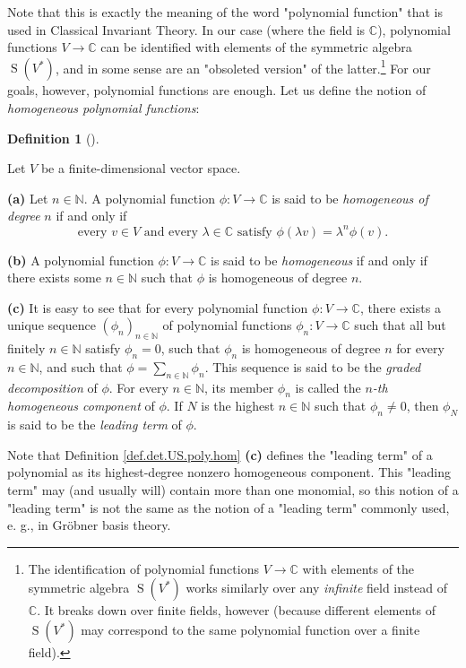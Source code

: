 \documentclass
[numbers=enddot,12pt,final,onecolumn,german,notitlepage]{scrartcl}%
\theoremstyle{definition}
\newtheorem{defi}[theo]{Definition}
\newenvironment{definition}[1][]
{\begin{defi}[#1]\begin{leftbar}}
{\end{leftbar}\end{defi}}
\begin{document}
Note that this is exactly the meaning of the word "polynomial function" that
is used in Classical Invariant Theory. In our case (where the field is
$\mathbb{C}$), polynomial functions $V\rightarrow\mathbb{C}$ can be identified
with elements of the symmetric algebra $\operatorname*{S}\left(  V^{\ast
}\right)  $, and in some sense are an "obsoleted version" of the
latter.\footnote{The identification of polynomial functions $V\rightarrow
\mathbb{C}$ with elements of the symmetric algebra $\operatorname*{S}\left(
V^{\ast}\right)  $ works similarly over any \textit{infinite} field instead of
$\mathbb{C}$. It breaks down over finite fields, however (because different
elements of $\operatorname*{S}\left(  V^{\ast}\right)  $ may correspond to the
same polynomial function over a finite field).} For our goals, however,
polynomial functions are enough. Let us define the notion of
\textit{homogeneous polynomial functions}:

\begin{definition}
\label{def.det.US.poly.hom}Let $V$ be a finite-dimensional vector space.

\textbf{(a)} Let $n\in\mathbb{N}$. A polynomial function $\phi:V\rightarrow
\mathbb{C}$ is said to be \textit{homogeneous of degree }$n$ if and only if%
\[
\text{every }v\in V\text{ and every }\lambda\in\mathbb{C}\text{ satisfy }%
\phi\left(  \lambda v\right)  =\lambda^{n}\phi\left(  v\right)  .
\]


\textbf{(b)} A polynomial function $\phi:V\rightarrow\mathbb{C}$ is said to be
\textit{homogeneous} if and only if there exists some $n\in\mathbb{N}$ such
that $\phi$ is homogeneous of degree $n$.

\textbf{(c)} It is easy to see that for every polynomial function
$\phi:V\rightarrow\mathbb{C}$, there exists a unique sequence $\left(
\phi_{n}\right)  _{n\in\mathbb{N}}$ of polynomial functions $\phi
_{n}:V\rightarrow\mathbb{C}$ such that all but finitely $n\in\mathbb{N}$
satisfy $\phi_{n}=0$, such that $\phi_{n}$ is homogeneous of degree $n$ for
every $n\in\mathbb{N}$, and such that $\phi=\sum\limits_{n\in\mathbb{N}}%
\phi_{n}$. This sequence is said to be the \textit{graded decomposition} of
$\phi$. For every $n\in\mathbb{N}$, its member $\phi_{n}$ is called the
$n$\textit{-th homogeneous component} of $\phi$. If $N$ is the highest
$n\in\mathbb{N}$ such that $\phi_{n}\neq0$, then $\phi_{N}$ is said to be the
\textit{leading term} of $\phi$.
\end{definition}

Note that Definition \ref{def.det.US.poly.hom} \textbf{(c)} defines the
"leading term" of a polynomial as its highest-degree nonzero homogeneous
component. This "leading term" may (and usually will) contain more than one
monomial, so this notion of a "leading term" is not the same as the notion of
a "leading term" commonly used, e. g., in Gr\"{o}bner basis theory.
\end{document}
